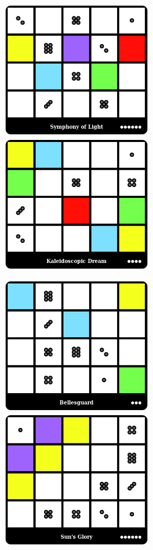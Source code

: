 \centerline{\mbox{\includegraphics[width=75mm]{img/WPC/SymphonyofLight.png}\includegraphics[width=75mm]{img/WPC/KaleidoscopicDream.png}}}
\centerline{\mbox{\includegraphics[width=75mm]{img/WPC/Bellesguard.png}\includegraphics[width=75mm]{img/WPC/Sun'sGlory.png}}}
